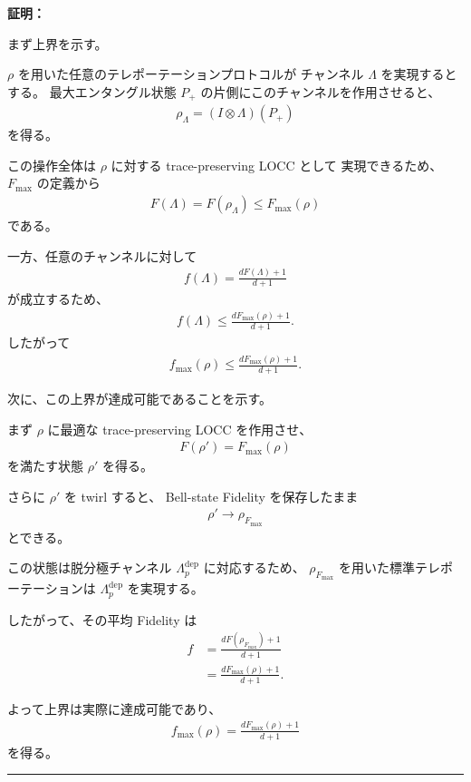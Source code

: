 \documentclass[a4paper,10.5pt]{article}
\numberwithin{equation}{section}
\newenvironment{proofbox}
{\begin{prooflabel}\textbf{証明：}\end{prooflabel}\vspace{0.8em}}
{\par\vspace{1em}\hrule\vspace{1em}}
\begin{document}
\begin{proofbox}
まず上界を示す。

$\rho$ を用いた任意のテレポーテーションプロトコルが
チャンネル $\Lambda$ を実現するとする。
最大エンタングル状態 $P_+$ の片側にこのチャンネルを作用させると、
\begin{align*}
    \rho_{\Lambda}
    =
    (I\otimes\Lambda)(P_+)
\end{align*}
を得る。

この操作全体は $\rho$ に対する trace-preserving LOCC として
実現できるため、$F_{\max}$ の定義から
\begin{align*}
    F(\Lambda)
    =
    F(\rho_{\Lambda})
    \leq
    F_{\max}(\rho)
\end{align*}
である。

一方、任意のチャンネルに対して
\begin{align*}
    f(\Lambda)
    =
    \frac{dF(\Lambda)+1}{d+1}
\end{align*}
が成立するため、
\begin{align*}
    f(\Lambda)
    \leq
    \frac{dF_{\max}(\rho)+1}{d+1}.
\end{align*}
したがって
\begin{align*}
    f_{\max}(\rho)
    \leq
    \frac{dF_{\max}(\rho)+1}{d+1}.
\end{align*}

次に、この上界が達成可能であることを示す。

まず $\rho$ に最適な trace-preserving LOCC を作用させ、
\begin{align*}
    F(\rho')
    =
    F_{\max}(\rho)
\end{align*}
を満たす状態 $\rho'$ を得る。

さらに $\rho'$ を twirl すると、
Bell-state Fidelity を保存したまま
\begin{align*}
    \rho'
    \longrightarrow
    \rho_{F_{\max}}
\end{align*}
とできる。

この状態は脱分極チャンネル
$\Lambda_p^{\mathrm{dep}}$ に対応するため、
$\rho_{F_{\max}}$ を用いた標準テレポーテーションは
$\Lambda_p^{\mathrm{dep}}$ を実現する。

したがって、その平均 Fidelity は
\begin{align*}
    f
    &=
    \frac{dF(\rho_{F_{\max}})+1}{d+1}\\
    &=
    \frac{dF_{\max}(\rho)+1}{d+1}.
\end{align*}

よって上界は実際に達成可能であり、
\begin{align*}
    \boxed{
    f_{\max}(\rho)
    =
    \frac{dF_{\max}(\rho)+1}{d+1}
    }
\end{align*}
を得る。
\end{proofbox}
\end{document}
